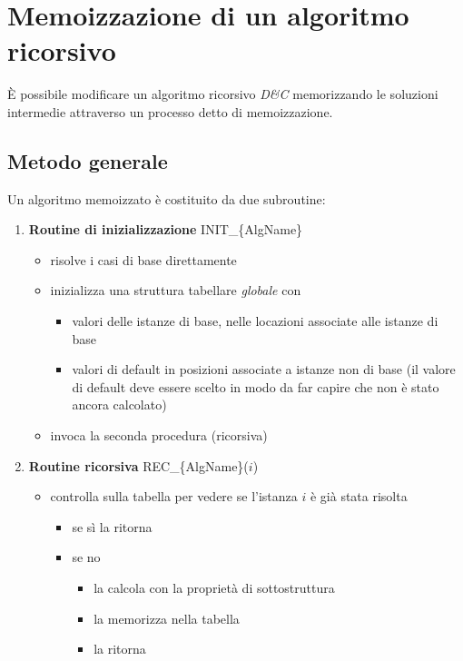 \section{Memoizzazione di un algoritmo ricorsivo}

È possibile modificare un algoritmo ricorsivo \emph{D\&C} memorizzando le soluzioni intermedie attraverso un processo detto di memoizzazione.

\subsection{Metodo generale}

Un algoritmo memoizzato è costituito da due subroutine:
\begin{enumerate}
    \item \textbf{Routine di inizializzazione} INIT\_\{AlgName\}
        \begin{itemize}
            \item risolve i casi di base direttamente
            \item inizializza una struttura tabellare \emph{globale} con
                \begin{itemize}
                    \item valori delle istanze di base, nelle locazioni associate alle istanze di base
                    \item valori di default in posizioni associate a istanze non di base (il valore di default deve essere scelto in modo da far capire che non è stato ancora calcolato)
                \end{itemize}
            \item invoca la seconda procedura (ricorsiva) \\ %
        \end{itemize}
    \item \textbf{Routine ricorsiva} REC\_\{AlgName\}($i$)
        \begin{itemize}
            \item controlla sulla tabella per vedere se l'istanza $i$ è già stata risolta
                \begin{itemize}
                    \item se sì la ritorna
                    \item se no
                        \begin{itemize}
                            \item la calcola con la proprietà di sottostruttura
                            \item la memorizza nella tabella
                            \item la ritorna
                        \end{itemize}
                \end{itemize}
        \end{itemize}
\end{enumerate}

